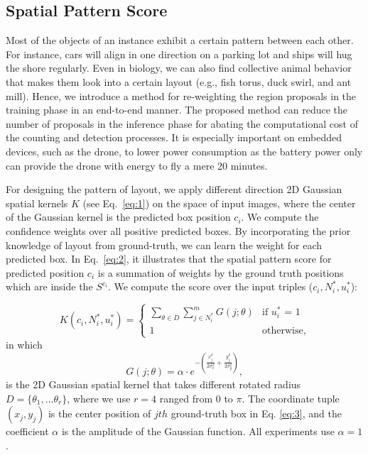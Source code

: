 \documentclass[10pt,twocolumn,letterpaper]{article}
\begin{document}
\subsection{Spatial Pattern Score} \label{sec:SPScore}
Most of the objects of an instance exhibit a certain pattern between each other. For instance, cars will align in one direction on a parking lot and ships will hug the shore regularly. Even in biology, we can also find collective animal behavior that makes them look into a certain layout (e.g., fish torus, duck swirl, and ant mill). Hence, we introduce a method for re-weighting the region proposals in the training phase in an end-to-end manner. The proposed method can reduce the number of proposals in the inference phase for abating the computational cost of the counting and detection processes. It is especially important on embedded devices, such as the drone, to lower power consumption as the battery power only can provide the drone with energy to fly a mere 20 minutes.

For designing the pattern of layout, we apply different direction 2D Gaussian spatial kernels $K$ (see Eq.~\ref{eq:1}) on the space of input images, where the center of the Gaussian kernel is the predicted box position $c_{i}$. We compute the confidence weights over all positive predicted boxes. By incorporating the prior knowledge of layout from ground-truth, we can learn the weight for each predicted box. In Eq.~\ref{eq:2}, it illustrates that the spatial pattern score for predicted position $c_{i}$ is a summation of weights by the ground truth positions which are inside the $S^{c_{i}}$. We compute the score over the input triples ($c_{i}, N_{i}^{*}, u_{i}^{*}$):
 	
\begin{equation} \label{eq:2}
K(c_{i}, N_{i}^{*}, u_{i}^{*}) = \begin{cases} \sum_{\theta \in D} \sum_{j \in N_{i}^{*}}^{m} G(j ; \theta) & \mbox{if } u_{i}^{*}\mbox{ = 1} \\ 
1 & \mbox{otherwise,} \end{cases} 
\end{equation}
in which
\begin{equation} \label{eq:3}
G(j ; \theta) = \alpha \cdot e^{-(\frac{x_{j}^{\theta}}{2 \sigma_{x}^{2}}+\frac{y_{j}^{\theta}}{2 \sigma_{y}^{2}})}, 
\end{equation}
is the 2D Gaussian spatial kernel that takes different rotated radius $D = \{\theta_{1},...\theta_{r}\}$, where we use $r = 4$ ranged from 0 to $\pi$. The coordinate tuple $(x_{j}, y_{j})$ is the center position of $jth$ ground-truth box in Eq. \ref{eq:3}, and the coefficient $\alpha$ is the amplitude of the Gaussian function. All experiments use $\alpha = 1$.
\end{document}
